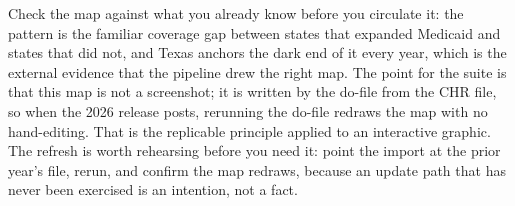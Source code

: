 Check the map against what you already know before you circulate it: the pattern is the familiar coverage gap between states that expanded Medicaid and states that did not, and Texas anchors the dark end of it every year, which is the external evidence that the pipeline drew the right map. The point for the suite is that this map is not a screenshot; it is written by the do-file from the CHR file, so when the 2026 release posts, rerunning the do-file redraws the map with no hand-editing. That is the replicable principle applied to an interactive graphic. The refresh is worth rehearsing before you need it: point the import at the prior year's file, rerun, and confirm the map redraws, because an update path that has never been exercised is an intention, not a fact.

